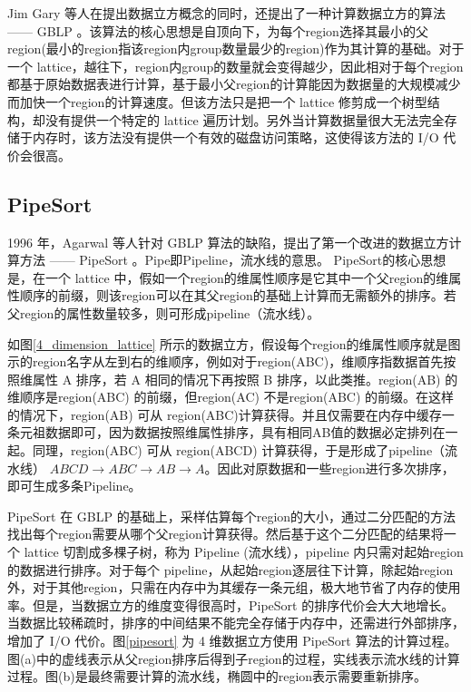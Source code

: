 Jim Gary 等人在提出数据立方概念的同时，还提出了一种计算数据立方的算法 —— GBLP \cite{gray1997data}。该算法的核心思想是自顶向下，为每个region选择其最小的父region(最小的region指该region内group数量最少的region)作为其计算的基础。对于一个 lattice，越往下，region内group的数量就会变得越少，因此相对于每个region都基于原始数据表进行计算，基于最小父region的计算能因为数据量的大规模减少而加快一个region的计算速度。但该方法只是把一个 lattice 修剪成一个树型结构，却没有提供一个特定的 lattice 遍历计划。另外当计算数据量很大无法完全存储于内存时，该方法没有提供一个有效的磁盘访问策略，这使得该方法的 I/O 代价会很高。

\subsection{PipeSort}

1996 年，Agarwal 等人针对 GBLP 算法的缺陷，提出了第一个改进的数据立方计算方法 —— PipeSort\cite{agarwal1996computation} 。Pipe即Pipeline，流水线的意思。
PipeSort的核心思想是，在一个 lattice 中，假如一个region的维属性顺序是它其中一个父region的维属性顺序的前缀，则该region可以在其父region的基础上计算而无需额外的排序。若父region的属性数量较多，则可形成pipeline（流水线）。

如图\ref{4_dimension_lattice} 所示的数据立方，假设每个region的维属性顺序就是图示的region名字从左到右的维顺序，例如对于region(ABC)，维顺序指数据首先按照维属性 A 排序，若 A 相同的情况下再按照 B 排序，以此类推。region(AB) 的维顺序是region(ABC) 的前缀，但region(AC) 不是region(ABC) 的前缀。在这样的情况下，region(AB) 可从 region(ABC)计算获得。并且仅需要在内存中缓存一条元祖数据即可，因为数据按照维属性排序，具有相同AB值的数据必定排列在一起。同理，region(ABC) 可从 region(ABCD) 计算获得，于是形成了pipeline（流水线） $ABCD\rightarrow ABC\rightarrow AB\rightarrow A$。因此对原数据和一些region进行多次排序，即可生成多条Pipeline。

PipeSort 在 GBLP 的基础上，采样估算每个region的大小，通过二分匹配的方法找出每个region需要从哪个父region计算获得。然后基于这个二分匹配的结果将一个 lattice 切割成多棵子树，称为 Pipeline (流水线），pipeline 内只需对起始region的数据进行排序。对于每个 pipeline，从起始region逐层往下计算，除起始region外，对于其他region，只需在内存中为其缓存一条元组，极大地节省了内存的使用率。但是，当数据立方的维度变得很高时，PipeSort 的排序代价会大大地增长。当数据比较稀疏时，排序的中间结果不能完全存储于内存中，还需进行外部排序，增加了 I/O 代价。图\ref{pipesort} 为 4 维数据立方使用 PipeSort 算法的计算过程。图(a)中的虚线表示从父region排序后得到子region的过程，实线表示流水线的计算过程。图(b)是最终需要计算的流水线，椭圆中的region表示需要重新排序。


